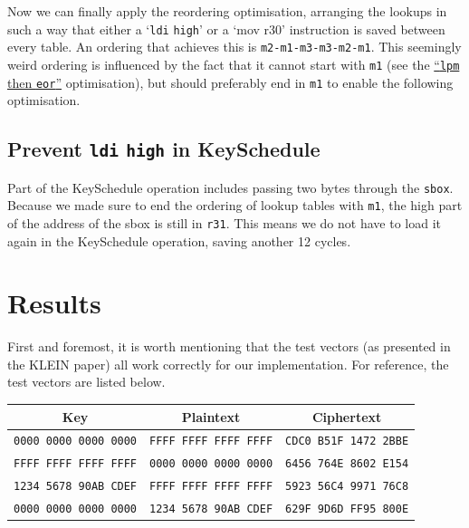 \documentclass[a4paper]{article}
\begin{document}
Now we can finally apply the reordering optimisation, arranging the lookups in such a way that either a `\texttt{ldi} \texttt{high}' or a `mov r30' instruction is saved between every table. An ordering that achieves this is 
\texttt{m2-m1-m3-m3-m2-m1}. This seemingly weird ordering is influenced by the fact that it cannot start with \texttt{m1} (see the \hyperlink{lpmtheneor}{``\texttt{lpm} then \texttt{eor}''} optimisation), but should preferably end in \texttt{m1} to enable the following optimisation.

\subsection*{Prevent \texttt{ldi} \texttt{high} in KeySchedule}

Part of the KeySchedule operation includes passing two bytes through the \texttt{sbox}. Because we made sure to end the ordering of lookup tables with \texttt{m1}, the high part of the address of the sbox is still in \texttt{r31}. This means we do not have to load it again in the KeySchedule operation, saving another 12 cycles.
\newpage
\section{Results}

First and foremost, it is worth mentioning that the test vectors (as presented in the KLEIN paper) all work correctly for our implementation. For reference, the test vectors are listed below.

\vspace{0.5em}
\begin{center}
	\begin{tabular}{c | c | c}
		\hline
		Key & Plaintext & Ciphertext \\
		\hline
	{\tt \small 0000 0000 0000 0000} & {\tt \small FFFF FFFF FFFF FFFF} & {\tt \small CDC0 B51F 1472 2BBE} \\
	{\tt \small FFFF FFFF FFFF FFFF} & {\tt \small 0000 0000 0000 0000} & {\tt \small 6456 764E 8602 E154} \\
	{\tt \small 1234 5678 90AB CDEF} & {\tt \small FFFF FFFF FFFF FFFF} & {\tt \small 5923 56C4 9971 76C8} \\
	{\tt \small 0000 0000 0000 0000} & {\tt \small 1234 5678 90AB CDEF} & {\tt \small 629F 9D6D FF95 800E} \\
		\hline
	\end{tabular}
\end{center}
\vspace{0.5em}
\end{document}
